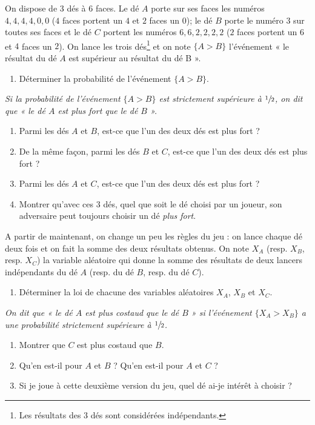 \documentclass[a4paper,12pt,reqno]{amsart}
\begin{document}
\begin{exo}

  On dispose de $3$ dés à $6$ faces. Le dé $A$ porte sur ses faces les numéros $4,4,4,4,0,0$ ($4$ faces portent un $4$ et $2$ faces un $0$); le dé $B$ porte le numéro $3$ sur toutes ses faces et le dé $C$ portent les numéros $6,6,2,2,2,2$ ($2$ faces portent un $6$ et $4$ faces un $2$). On lance les trois dés\footnote{Les résultats des $3$ dés sont considérées indépendants.} et on note $\{A>B\}$ l'événement « le résultat du dé $A$ est supérieur au résultat du dé B ».
  \begin{enumerate}
    \item Déterminer la probabilité de l'événement $\{A>B\}$.
  \end{enumerate}
  \emph{Si la probabilité de l'événement  $\{A>B\}$ est strictement supérieure à $\sfrac{1}{2}$, on dit que « le dé $A$ est plus fort que le dé $B$ ».}
  \begin{enumerate}[resume]
    \item Parmi les dés $A$ et $B$, est-ce que l'un des deux dés est plus fort ?
    \item De la même façon, parmi les dés $B$ et $C$, est-ce que l'un des deux dés est plus fort ?
    \item Parmi les dés $A$ et $C$, est-ce que l'un des deux dés est plus fort ?
    \item Montrer qu'avec ces $3$ dés, quel que soit le dé choisi par un joueur, son adversaire peut toujours choisir un dé \emph{plus fort}.
  \end{enumerate}\smallskip
  A partir de maintenant, on change un peu les règles du jeu : on lance chaque dé deux fois et on fait la somme des deux résultats obtenus.
  On note $X_A$ (resp. $X_B$, resp. $X_C$) la variable aléatoire qui donne la somme des résultats de deux lancers indépendants du dé $A$ (resp. du dé $B$, resp. du dé $C$).
  \begin{enumerate}[resume]
    \item Déterminer la loi  de chacune des variables aléatoires $X_A$, $X_B$ et $X_C$.
  \end{enumerate}
  \emph{On dit que « le dé $A$ est plus costaud que le dé $B$ » si l'événement $\{X_A >X_B\}$ a une probabilité strictement supérieure à $\sfrac{1}{2}$.}
  \begin{enumerate}[resume]
    \item Montrer que $C$ est plus costaud que $B.$
    \item Qu'en est-il pour $A$ et $B$ ? Qu'en est-il pour $A$ et $C$ ?
    \item Si je joue à cette deuxième version du jeu, quel dé ai-je intérêt à choisir ? \\
  \end{enumerate}

\end{exo}
\end{document}
